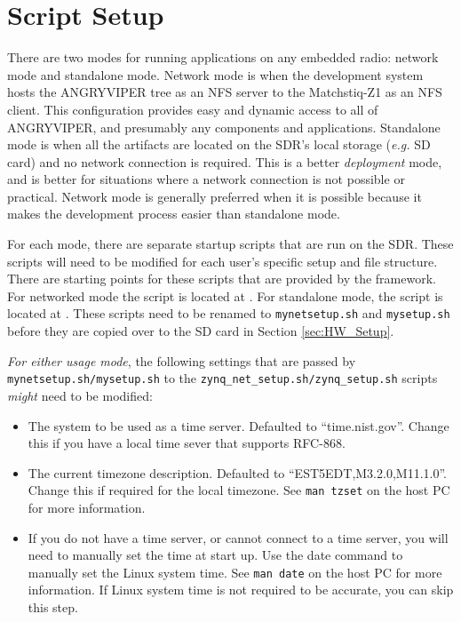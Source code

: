 \section{Script Setup}
There are two modes for running applications on any embedded radio: network mode and standalone mode.  Network mode is when the development system hosts the ANGRYVIPER tree as an NFS server to the Matchstiq-Z1 as an NFS client.  This configuration provides easy and dynamic access to all of ANGRYVIPER, and presumably any components and applications.  Standalone mode is when all the artifacts are located on the SDR's local storage (\textit{e.g.} SD card) and no network connection is required.  This is a better \textit{deployment} mode, and is better for situations where a network connection is not possible or practical.  Network mode is generally preferred when it is possible because it makes the development process easier than standalone mode.

\begin{flushleft}
For each mode, there are separate startup scripts that are run on the SDR. These scripts will need to be modified for each user's specific setup and file structure.  There are starting points for these scripts that are provided by the framework.  For networked mode the script is located at .  For standalone mode, the script is located at .  These scripts need to be renamed to \texttt{mynetsetup.sh} and \texttt{mysetup.sh} before they are copied over to the SD card in Section \ref{sec:HW_Setup}. \\ \bigskip

\textit{For either usage mode}, the following settings that are passed by \texttt{mynetsetup.sh/mysetup.sh} to the \texttt{zynq\_net\_setup.sh/zynq\_setup.sh} scripts \textit{might} need to be modified:
\end{flushleft}

\begin{itemize}
 \item The system to be used as a time server. Defaulted to ``time.nist.gov''. Change this if you have a local time sever that supports RFC-868.
 \item The current timezone description. Defaulted to ``EST5EDT,M3.2.0,M11.1.0''.  Change this if required for the local timezone. See \texttt{man tzset} on the host PC for more information.
 \item If you do not have a time server, or cannot connect to a time server, you will need to manually set the time at start up.  Use the date command to manually set the Linux system time. See \texttt{man date} on the host PC for more information.  If Linux system time is not required to be accurate, you can skip this step.
\end{itemize}

